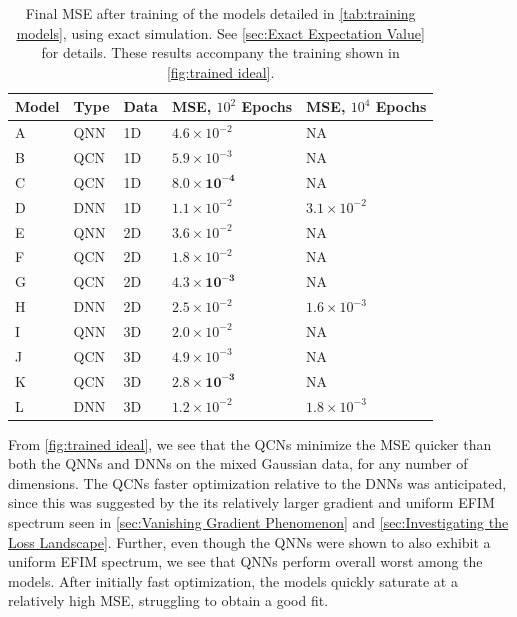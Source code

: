 \begin{table}[H]
\centering
\caption{Final MSE after training of the models detailed in \autoref{tab:training models}, using exact simulation. See \autoref{sec:Exact Expectation Value} for details. These results accompany the training shown in \autoref{fig:trained ideal}.}
\begin{tabular}{|l|l|l|l|l|}
\hline
Model& Type& Data& MSE, $10^{2}$ Epochs& MSE, $10^{4}$ Epochs \\ \hline
A    & QNN & 1D  &  $4.6\times 10^{-2}$  & NA   \\ \hline
B    & QCN & 1D  & $5.9\times 10^{-3}$  & NA \\ \hline
C    & QCN & 1D  & $\boldsymbol{8.0\times 10^{-4}}$  & NA  \\ \hline
D    & DNN & 1D  & $1.1\times 10^{-2}$ & $3.1\times 10^{-2}$  \\ \Xhline{2\arrayrulewidth}
E    & QNN & 2D  &  $3.6\times 10^{-2}$ & NA  \\ \hline
F    & QCN & 2D  &  $1.8\times 10^{-2}$ & NA  \\ \hline
G    & QCN & 2D  &  $\boldsymbol{4.3\times 10^{-3}}$ & NA  \\ \hline
H    & DNN & 2D  &  $2.5\times10^{-2}$ & $1.6\times10^{-3}$\\ 
\Xhline{2\arrayrulewidth}
I    & QNN & 3D  &  $2.0\times 10^{-2}$& NA  \\ \hline
J    & QCN & 3D  &  $4.9\times 10^{-3}$ & NA  \\ \hline
K    & QCN & 3D  &  $\boldsymbol{2.8\times10^{-3}}$  & NA  \\ \hline
L    & DNN & 3D  &  $1.2\times10^{-2}$  & $1.8\times10^{-3}$  \\ \hline
\end{tabular}
 
\label{tab:training models mse}
\end{table}

From \autoref{fig:trained ideal}, we see that the QCNs minimize the MSE quicker than both the QNNs and DNNs on the mixed Gaussian data, for any number of dimensions. The QCNs faster optimization relative to the DNNs was anticipated, since this was suggested by the its relatively larger gradient and uniform EFIM spectrum seen in \autoref{sec:Vanishing Gradient Phenomenon} and \autoref{sec:Investigating the Loss Landscape}. Further, even though the QNNs were shown to also exhibit a uniform EFIM spectrum, we see that QNNs perform overall worst among the models. After initially fast optimization, the models quickly saturate at a relatively high MSE, struggling to obtain a good fit. 


